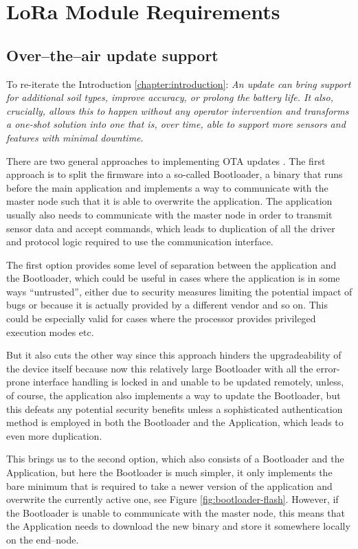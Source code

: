\section{LoRa Module Requirements}
\subsection{\label{section:ota-update-support}Over--the--air update support}
To re-iterate the Introduction \ref{chapter:introduction}: \emph{An update can bring support for additional soil types, improve accuracy, or prolong the battery life. It also, crucially, allows this to happen without any operator intervention and transforms a one-shot solution into one that is, over time, able to support more sensors and features with minimal downtime}.

There are two general approaches to implementing OTA updates \cite{bucklin_brown_over--air_2024,noauthor_android_2024}. The first approach is to split the firmware into a so-called Bootloader, a binary that runs before the main application and implements a way to communicate with the master node such that it is able to overwrite the application. The application usually also needs to communicate with the master node in order to transmit sensor data and accept commands, which leads to duplication of all the driver and protocol logic required to use the communication interface.

The first option provides some level of separation between the application and the Bootloader, which could be useful in cases where the application is in some ways ``untrusted'', either due to security measures limiting the potential impact of bugs or because it is actually provided by a different vendor and so on. This could be especially valid for cases where the processor provides privileged execution modes etc.

But it also cuts the other way since this approach hinders the upgradeability of the device itself because now this relatively large Bootloader with all the error-prone interface handling is locked in and unable to be updated remotely, unless, of course, the application also implements a way to update the Bootloader, but this defeats any potential security benefits unless a sophisticated authentication method is employed in both the Bootloader and the Application, which leads to even more duplication.

This brings us to the second option, which also consists of a Bootloader and the Application, but here the Bootloader is much simpler, it only implements the bare minimum that is required to take a newer version of the application and overwrite the currently active one, see Figure \ref{fig:bootloader-flash}. However, if the Bootloader is unable to communicate with the master node, this means that the Application needs to download the new binary and store it somewhere locally on the end--node.

